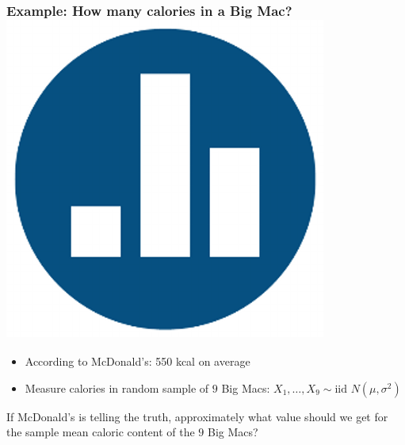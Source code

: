 \begin{frame}[t]
	\frametitle{Example: How many calories in a Big Mac? \hfill \includegraphics[scale = 0.05]{./images/clicker}}
\begin{itemize}
	\item According to McDonald's: 550 kcal on average
	\item Measure calories in random sample of $9$ Big Macs: $X_1, \hdots, X_{9} \sim \mbox{iid } N(\mu, \sigma^2)$
\end{itemize}

\vspace{1em}

\alert{If McDonald's is telling the truth, approximately what value should we get for the sample mean caloric content of the $9$ Big Macs?} 
\end{frame}
